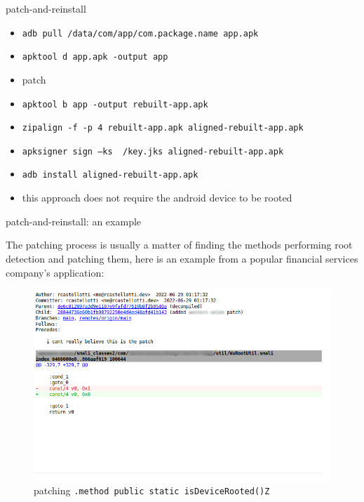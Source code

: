 \documentclass{beamer}
\begin{document}
\begin{frame}{patch-and-reinstall}

    \begin{itemize}
        \item {\footnotesize \texttt{adb pull /data/com/app/com.package.name app.apk}}
        \item {\footnotesize \texttt{apktool d app.apk -output app}}
        \item patch
        \item {\footnotesize \texttt{apktool b app -output rebuilt-app.apk}}
        \item {\footnotesize \texttt{zipalign -f -p 4 rebuilt-app.apk  aligned-rebuilt-app.apk}}
        \item {\footnotesize \texttt{apksigner sign --ks ~/key.jks  aligned-rebuilt-app.apk}}
        \item {\footnotesize \texttt{adb install aligned-rebuilt-app.apk}}
        \item this approach does not require the android device to be rooted 
    \end{itemize}

\end{frame}

\begin{frame}[fragile]{patch-and-reinstall: an example}

   The patching process is usually a matter of finding the methods performing root detection and patching them, here is an example from a popular financial services company's application:

    \begin{figure}
        \centering \includegraphics[scale=1.2]{patch.png}
        \caption{patching \texttt{.method public static isDeviceRooted()Z} }
    \end{figure}

\end{frame}
\end{document}
